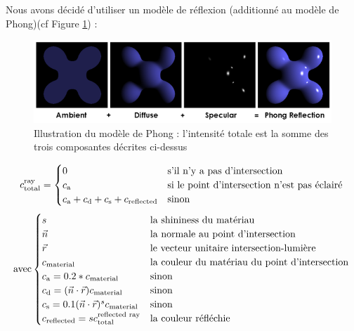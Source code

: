 \documentclass[a4paper,oneside,12pt,titlepage]{article}
\begin{document}
\begin{sloppypar}
Nous avons décidé d'utiliser un modèle de réflexion (additionné au modèle de Phong)(cf Figure \ref{fig:phong}) :
\begin{figure}[!h]
    \centering
    \includegraphics[width=\linewidth]{./Phong_components.png}
    \caption{Illustration du modèle de Phong : l'intensité totale est la somme des trois composantes décrites ci-dessus}
    \label{fig:phong}
\end{figure}

\begin{equation*}
  c_{\text{total}}^{\text{ray}} =
    \begin{cases}
      0 & \text{s'il n'y a pas d'intersection}\\
      c_{\text{a}} & \text{si le point d'intersection n'est pas éclairé}\\
      c_{\text{a}} + c_{\text{d}} + c_{\text{s}} + c_{\text{reflected}} & \text{sinon}\\
    \end{cases}\\
\end{equation*}
\begin{equation*}
  \text{avec}
    \begin{cases}
      s & \text{la shininess du matériau}\\
      \vec{n} & \text{la normale au point d'intersection}\\
      \vec{r} & \text{le vecteur unitaire intersection-lumière}\\
      c_{\text{material}} & \text{la couleur du matériau du point d'intersection}\\
      c_{\text{a}} = 0.2*c_{\text{material}} & \text{sinon}\\
      c_{\text{d}} = (\vec{n}\cdot\vec{r})c_{\text{material}} & \text{sinon}\\
      c_{\text{s}} = 0.1(\vec{n}\cdot\vec{r})^sc_{\text{material}}& \text{sinon}\\
      c_{\text{reflected}}=sc_{\text{total}}^{\text{reflected ray}} & \text{la couleur réfléchie}\\
    \end{cases}\\
\end{equation*}


\end{sloppypar}
\end{document}
